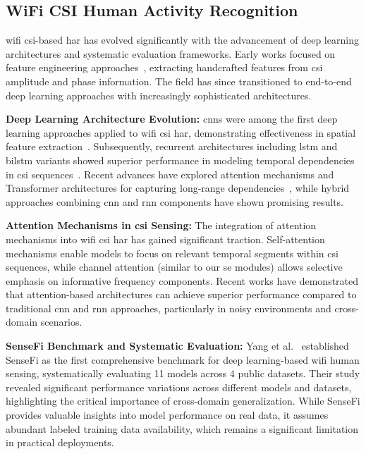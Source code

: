 \documentclass[journal]{IEEEtran}
\begin{document}
\subsection{WiFi CSI Human Activity Recognition}

\gls{wifi} \gls{csi}-based \gls{har} has evolved significantly with the advancement of deep learning architectures and systematic evaluation frameworks. Early works focused on feature engineering approaches~\cite{csi_basics2016}, extracting handcrafted features from \gls{csi} amplitude and phase information. The field has since transitioned to end-to-end deep learning approaches with increasingly sophisticated architectures.

\textbf{Deep Learning Architecture Evolution:} \glspl{cnn} were among the first deep learning approaches applied to \gls{wifi} \gls{csi} \gls{har}, demonstrating effectiveness in spatial feature extraction~\cite{clnet2021}. Subsequently, recurrent architectures including \gls{lstm} and \gls{bilstm} variants showed superior performance in modeling temporal dependencies in \gls{csi} sequences~\cite{rewis2022}. Recent advances have explored attention mechanisms and Transformer architectures for capturing long-range dependencies~\cite{autofi2022}, while hybrid approaches combining \gls{cnn} and \gls{rnn} components have shown promising results.

\textbf{Attention Mechanisms in \gls{csi} Sensing:} The integration of attention mechanisms into \gls{wifi} \gls{csi} \gls{har} has gained significant traction. Self-attention mechanisms enable models to focus on relevant temporal segments within \gls{csi} sequences, while channel attention (similar to our \gls{se} modules) allows selective emphasis on informative frequency components. Recent works have demonstrated that attention-based architectures can achieve superior performance compared to traditional \gls{cnn} and \gls{rnn} approaches, particularly in noisy environments and cross-domain scenarios.

\textbf{SenseFi Benchmark and Systematic Evaluation:} Yang et al.~\cite{yang2023sensefi} established SenseFi as the first comprehensive benchmark for deep learning-based \gls{wifi} human sensing, systematically evaluating 11 models across 4 public datasets. Their study revealed significant performance variations across different models and datasets, highlighting the critical importance of cross-domain generalization. While SenseFi provides valuable insights into model performance on real data, it assumes abundant labeled training data availability, which remains a significant limitation in practical deployments.
\end{document}
